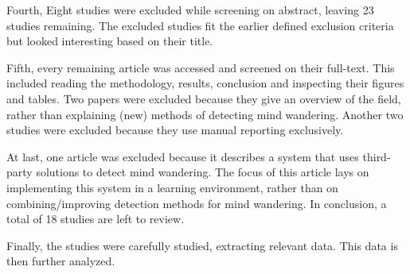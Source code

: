 Fourth, Eight studies were excluded while screening on abstract, leaving 23 studies remaining. 
The excluded studies fit the earlier defined exclusion criteria but looked interesting based on their title.

Fifth, every remaining article was accessed and screened on their full-text. This included reading the methodology, results, conclusion and inspecting their figures and tables.
Two papers were excluded because they give an overview of the field, rather than explaining (new) methods of detecting mind wandering. 
Another two studies were excluded because they use manual reporting exclusively.

At last, one article was excluded because it describes a system that uses third-party solutions to detect mind wandering. The focus of this article lays on implementing this system in a learning environment, rather than on combining/improving detection methods for mind wandering.
In conclusion, a total of 18 studies are left to review.

Finally, the studies were carefully studied, extracting relevant data. This data is then further analyzed.